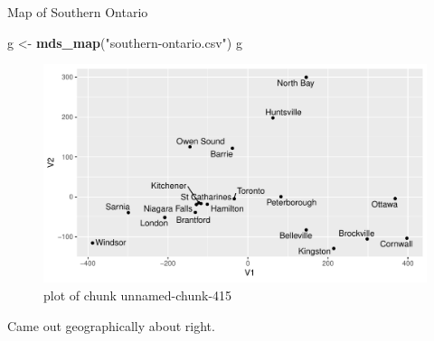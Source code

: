\documentclass[ignorenonframetext,]{beamer}
\newenvironment{Shaded}{\begin{snugshade}}{\end{snugshade}}
\newcommand{\KeywordTok}[1]{\textcolor[rgb]{0.13,0.29,0.53}{\textbf{#1}}}
\newcommand{\NormalTok}[1]{#1}
\newcommand{\StringTok}[1]{\textcolor[rgb]{0.31,0.60,0.02}{#1}}
\begin{document}
\begin{frame}[fragile]{Map of Southern Ontario}
\protect\hypertarget{map-of-southern-ontario}{}

\begin{Shaded}
\begin{Highlighting}[]
\NormalTok{g <-}\StringTok{ }\KeywordTok{mds_map}\NormalTok{(}\StringTok{"southern-ontario.csv"}\NormalTok{)}
\NormalTok{g}
\end{Highlighting}
\end{Shaded}

\begin{figure}
\centering
\includegraphics{figure/unnamed-chunk-415-1.pdf}
\caption{plot of chunk unnamed-chunk-415}
\end{figure}

Came out geographically about right.

\end{frame}
\end{document}
